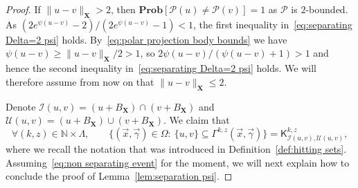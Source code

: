 \documentclass[11pt,reqno]{amsart}
\renewcommand{\le}{\leqslant}
\renewcommand{\ge}{\geqslant}
\newcommand{\X}{\mathbf X}
\theoremstyle{remark}
\renewcommand{\subset}{\subseteq}
\newcommand{\N}{\mathbb N}
\renewcommand{\Pr}{\mathbf{Prob}}
\renewcommand{\1}{\mathbf 1}
\newcommand{\Part}{\mathscr{P}}
\begin{document}
\begin{proof} If $\|u-v\|_\X>2$, then $\Pr[\Part(u)\neq \Part(v)]=1$ as $\Part$ is $2$-bounded. As $(2e^{\psi(u-v)}-2)/(2e^{\psi(u-v)}-1)<1$, the first inequality in~\eqref{eq:separating Delta=2 psi} holds. By~\eqref{eq:polar projection body bounds} we have $\psi(u-v)\ge \|u-v\|_\X/2> 1$, so $2\psi(u-v)/(\psi(u-v)+1)> 1$ and hence the second inequality in~\eqref{eq:separating Delta=2 psi}  holds. We will therefore assume from now on that $\|u-v\|_\X\le 2$.


Denote $\mathscr{I}(u,v)=(u+B_{\X})\cap (v+B_{\X})$ and $\mathscr{U}(u,v)=(u+B_{\X})\cup (v+B_{\X})$. We claim that
\begin{equation}\label{eq:non separating event}
\forall(k,z)\in \N\times \Lambda,\qquad \big\{(\vec{x},\vec{\gamma})\in \Omega:\ \{u,v\}\subset \Gamma^{k,z}(\vec{x},\vec{\gamma})\big\}= \mathsf{K}^{k,z}_{\mathscr{I}(u,v),\mathscr{U}(u,v)},
\end{equation}
where we recall the notation that was introduced in Definition~\ref{def:hitting sets}. Assuming~\eqref{eq:non separating event} for the moment, we will next explain how to conclude the proof of Lemma~\ref{lem:separation psi}.





\end{proof}
\end{document}
